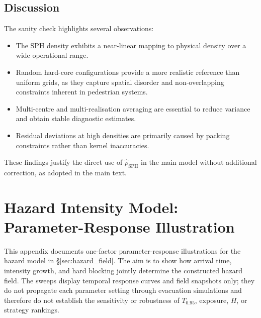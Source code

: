 \documentclass[preprint,12pt]{elsarticle}
\providecommand{\FloatBarrier}{}
\let\origsection\section
\renewcommand{\section}{\FloatBarrier\origsection}
\let\origsubsection\subsection
\renewcommand{\subsection}{\FloatBarrier\origsubsection}
\begin{document}
\subsection{Discussion}
\label{app:calib_discussion}

The sanity check highlights several observations:

\begin{itemize}
    \item The SPH density exhibits a near-linear mapping to physical density
    over a wide operational range.

    \item Random hard-core configurations provide a more realistic reference
    than uniform grids, as they capture spatial disorder and non-overlapping
    constraints inherent in pedestrian systems.

    \item Multi-centre and multi-realisation averaging are essential to reduce
    variance and obtain stable diagnostic estimates.

    \item Residual deviations at high densities are primarily caused by packing
    constraints rather than kernel inaccuracies.
\end{itemize}

These findings justify the direct use of $\hat{\rho}_{\mathrm{SPH}}$ in the main
model without additional correction, as adopted in the main text.








\section{Hazard Intensity Model: Parameter-Response Illustration}
\label{sm:hazard_sensitivity}

This appendix documents one-factor parameter-response illustrations for
the hazard model in \S\ref{sec:hazard_field}. The aim is to show how
arrival time, intensity growth, and hard blocking jointly determine the
constructed hazard field. The sweeps display temporal response curves
and field snapshots only; they do not propagate each parameter setting
through evacuation simulations and therefore do not establish the
sensitivity or robustness of $T_{0.95}$, exposure, $H$, or strategy
rankings.
\end{document}
